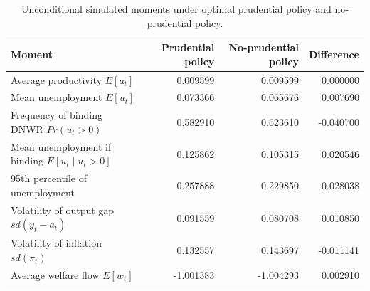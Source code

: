 \begin{table}
\caption{Unconditional simulated moments under optimal prudential policy and no-prudential policy.}
\label{tab:q8_unconditional_moments}
\begin{tabular}{lrrr}
\toprule
Moment & Prudential policy & No-prudential policy & Difference \\
\midrule
Average productivity $E[a_t]$ & 0.009599 & 0.009599 & 0.000000 \\
Mean unemployment $E[u_t]$ & 0.073366 & 0.065676 & 0.007690 \\
Frequency of binding DNWR $Pr(u_t>0)$ & 0.582910 & 0.623610 & -0.040700 \\
Mean unemployment if binding $E[u_t\mid u_t>0]$ & 0.125862 & 0.105315 & 0.020546 \\
95th percentile of unemployment & 0.257888 & 0.229850 & 0.028038 \\
Volatility of output gap $sd(y_t-a_t)$ & 0.091559 & 0.080708 & 0.010850 \\
Volatility of inflation $sd(\pi_t)$ & 0.132557 & 0.143697 & -0.011141 \\
Average welfare flow $E[w_t]$ & -1.001383 & -1.004293 & 0.002910 \\
\bottomrule
\end{tabular}
\end{table}
